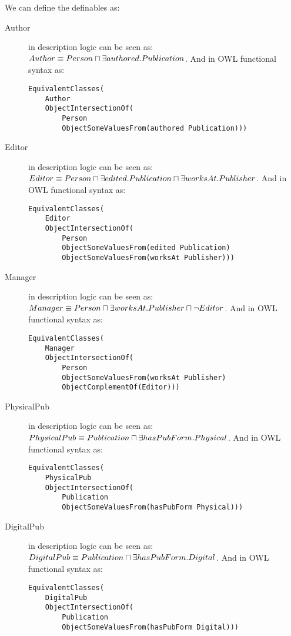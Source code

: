 \documentclass[a4paper,12pt]{article}
\begin{document}
We can define the definables as:
\begin{description}
\item[Author] in description logic can be seen as: $ Author \equiv Person\\
\sqcap \exists authored.Publication $.  And in OWL functional syntax as:
\begin{Verbatim}[samepage=true]
EquivalentClasses(
    Author
    ObjectIntersectionOf(
        Person
        ObjectSomeValuesFrom(authored Publication)))
\end{Verbatim}

\item[Editor] in description logic can be seen as: $ Editor \equiv Person\\
\sqcap \exists edited.Publication \sqcap \exists worksAt.Publisher $.  And in
OWL functional syntax as:
\begin{Verbatim}[samepage=true]
EquivalentClasses(
    Editor
    ObjectIntersectionOf(
        Person
        ObjectSomeValuesFrom(edited Publication)
        ObjectSomeValuesFrom(worksAt Publisher)))
\end{Verbatim}

\item[Manager] in description logic can be seen as: $ Manager \equiv Person\\
\sqcap \exists worksAt.Publisher \sqcap \neg Editor $.  And in OWL functional
syntax as:
\begin{Verbatim}[samepage=true]
EquivalentClasses(
    Manager
    ObjectIntersectionOf(
        Person
        ObjectSomeValuesFrom(worksAt Publisher)
        ObjectComplementOf(Editor)))
\end{Verbatim}

\item[PhysicalPub] in description logic can be seen as: $ PhysicalPub \equiv\\
Publication \sqcap \exists hasPubForm.Physical $.  And in OWL functional syntax
as:
\begin{Verbatim}[samepage=true]
EquivalentClasses(
    PhysicalPub
    ObjectIntersectionOf(
        Publication
        ObjectSomeValuesFrom(hasPubForm Physical)))
\end{Verbatim}

\item[DigitalPub] in description logic can be seen as: $ DigitalPub \equiv\\
Publication \sqcap \exists hasPubForm.Digital $.  And in OWL functional syntax
as:
\begin{Verbatim}[samepage=true]
EquivalentClasses(
    DigitalPub
    ObjectIntersectionOf(
        Publication
        ObjectSomeValuesFrom(hasPubForm Digital)))
\end{Verbatim}
\end{description}
\end{document}

